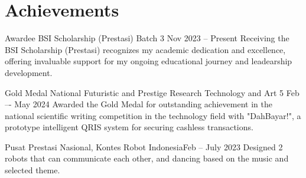 \section{Achievements}
\resumeSubHeadingListStart
    
    \achiSubheading
    {Awardee BSI Scholarship (Prestasi) Batch 3 }{Nov 2023 -- Present}
    {Receiving the BSI Scholarship (Prestasi) recognizes my academic dedication and excellence, offering invaluable support for my ongoing educational journey and leadearship development.}{}

    \achiSubheading
    {Gold Medal National Futuristic and Prestige Research Technology and Art 5 }{Feb –- May 2024}
    {Awarded the Gold Medal for outstanding achievement in the national scientific writing competition in the technology field with "DahBayar!", a prototype intelligent QRIS system for securing cashless transactions.}{}
    
    \achiSubheading
    {Pusat Prestasi Nasional, Kontes Robot Indonesia}{Feb -- July 2023}
    {Designed 2 robots that can communicate each other, and dancing based on the music and selected theme.}{}
    \resumeItemListStart
    \resumeItemListEnd

\resumeSubHeadingListEnd